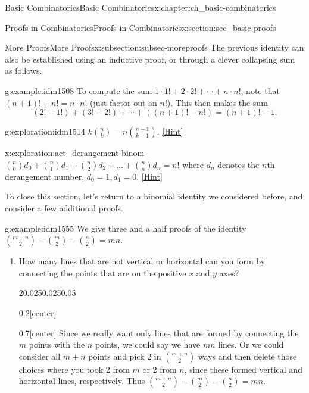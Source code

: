\documentclass[oneside,10pt,]{book}
\numberwithin{equation}{chapter}
\begin{document}
\begin{chapterptx}{Basic Combinatorics}{}{Basic Combinatorics}{}{}{x:chapter:ch_basic-combinatorics}
\begin{sectionptx}{Proofs in Combinatorics}{}{Proofs in Combinatorics}{}{}{x:section:sec_basic-proofs}
\begin{subsectionptx}{More Proofs}{}{More Proofs}{}{}{x:subsection:subsec-moreproofs}
The previous identity can also be established using an inductive proof, or through a clever collapsing sum as follows.%
\begin{example}{}{g:example:idm1508}%
To compute the sum \(1\cdot 1! + 2 \cdot 2! + \cdots + n \cdot n!\), note that \((n+1)! - n! = n\cdot n!\) (just factor out an \(n!\)).  This then makes the sum%
\begin{equation*}
(2! - 1!) + (3! - 2!) + \cdots + ((n+1)! - n!) = (n+1)! - 1 \text{.}
\end{equation*}
%
\end{example}
\begin{exploration}{}{g:exploration:idm1514}%
\(k \binom{n}{k} = n \binom{n - 1}{k - 1}\).%
\space\hspace*{0pt}\hfill{\tiny\hyperlink{g:hint:idm1518-back}{[Hint]}}\end{exploration}
\begin{exploration}{}{x:exploration:act_derangement-binom}%
\(\binom{n}{0} d_{0} + \binom{n}{1} d_{1} + \binom{n}{2} d_{2} + \ldots + \binom{n}{n} d_{n} = n!\) where \(d_{n}\) denotes the \(n\)th derangement number, \(d_{0} = 1,d_{1} = 0\).%
\space\hspace*{0pt}\hfill{\tiny\hyperlink{g:hint:idm1541-back}{[Hint]}}\end{exploration}
To close this section, let's return to a binomial identity we considered before, and consider a few additional proofs.%
\begin{example}{}{g:example:idm1555}%
We give three and a half proofs of the identity \(\binom{m + n}{2} - \binom{m}{2} - \binom{n}{2} = mn\).%
\begin{enumerate}
\item{}How many lines that are not vertical or horizontal can you form by connecting the points that are on the positive \(x\) and \(y\) axes?%
\begin{sidebyside}{2}{0.025}{0.025}{0.05}%
\begin{sbspanel}{0.2}[center]%
%
\end{sbspanel}%
\begin{sbspanel}{0.7}[center]%
Since we really want only lines that are formed by connecting the \(m\) points with the \(n\) points, we could say we have \(mn\) lines. Or we could consider all \(m + n\) points and pick 2 in \(\binom{m+n}{2}\) ways and then delete those choices where you took 2 from \(m\) or 2 from \(n\), since these formed vertical and horizontal lines, respectively.  Thus \(\binom{m + n}{2} - \binom{m}{2} - \binom{n}{2} = mn\).%

\end{sbspanel}
\end{sidebyside}
\end{enumerate}
\end{example}
\end{subsectionptx}
\end{sectionptx}
\end{chapterptx}
\end{document}
